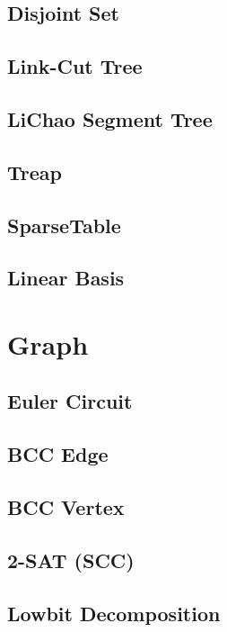 \documentclass[a4paper,10pt,twocolumn,oneside]{article}
\begin{document}
\subsection{Disjoint Set}

\subsection{Link-Cut Tree}

\subsection{LiChao Segment Tree}

\subsection{Treap}

\subsection{SparseTable}

\subsection{Linear Basis}


\section{Graph}
\subsection{Euler Circuit}

\subsection{BCC Edge}

\subsection{BCC Vertex}

\subsection{2-SAT (SCC)}

\subsection{Lowbit Decomposition}

\end{document}
